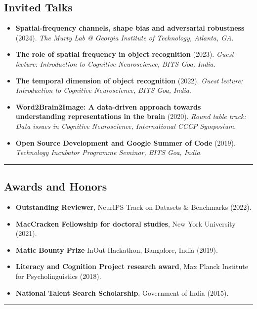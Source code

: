 \documentclass[10pt,letterpaper]{article}
\begin{document}
\subsection*{\Large Invited Talks}
\begin{itemize}[leftmargin=1em,itemsep=0.3em]
     \item \textbf{Spatial-frequency channels, shape bias and adversarial robustness} (2024). \textit{The Murty Lab @ Georgia Institute of Technology, Atlanta, GA}.
     \item \textbf{The role of spatial frequency in object recognition} (2023). \textit{Guest lecture: Introduction to Cognitive Neuroscience, BITS Goa, India}.
     \item \textbf{The temporal dimension of object recognition} (2022). \textit{Guest lecture: Introduction to Cognitive Neuroscience, BITS Goa, India}.
     \item \textbf{Word2Brain2Image: A data-driven approach towards understanding representations in the brain} (2020). \textit{Round table track: Data issues in Cognitive Neuroscience, International CCCP Symposium}.
     \item \textbf{Open Source Development and Google Summer of Code} (2019). \textit{Technology Incubator Programme Seminar, BITS Goa, India}.

\end{itemize}

\hrule
\vspace{-1em}
\subsection*{\Large Awards and Honors}
\begin{itemize}[leftmargin=1em,itemsep=0.3em]
     \item \textbf{Outstanding Reviewer}, NeurIPS Track on Datasets \& Benchmarks (2022).
     \item \textbf{MacCracken Fellowship for doctoral studies}, New York University (2021).
     \item \textbf{Matic Bounty Prize} InOut Hackathon, Bangalore, India (2019).
     \item \textbf{Literacy and Cognition Project research award}, Max Planck Institute for Psycholinguistics (2018).
     \item \textbf{National Talent Search Scholarship}, Government of India (2015).
\end{itemize}

\hrule
\end{document}
